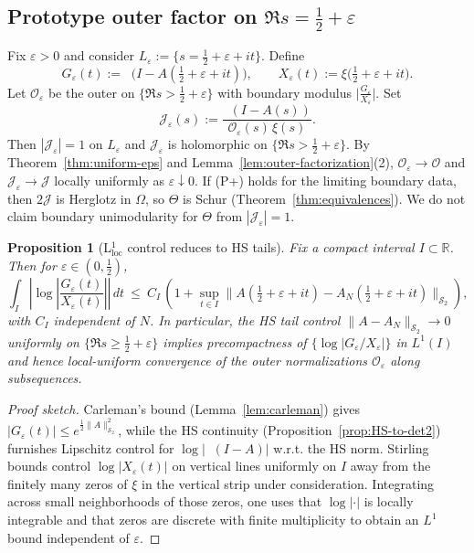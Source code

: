 \documentclass[11pt]{article}
\newtheorem{proposition}[theorem]{Proposition}
\theoremstyle{remark}
\newcommand{\HS}{\mathcal{S}_2}
\DeclareMathOperator{\dettwo}{det_2}
\begin{document}
\subsection{Prototype outer factor on \(\Re s=\tfrac12+\varepsilon\)}\label{subsec:outer-prototype}
Fix \(\varepsilon>0\) and consider \(L_{\varepsilon}:=\{s=\tfrac12+\varepsilon+it\}\). Define
\[
 G_{\varepsilon}(t):=\dettwo\big(I-A(\tfrac12+\varepsilon+it)\big),\qquad X_{\varepsilon}(t):=\xi\big(\tfrac12+\varepsilon+it\big).
\]
Let \(\mathcal O_{\varepsilon}\) be the outer on \(\{\Re s>\tfrac12+\varepsilon\}\) with boundary modulus \(\big|\frac{G_{\varepsilon}}{X_{\varepsilon}}\big|\). Set
\[
 \mathcal J_{\varepsilon}(s):=\frac{\dettwo(I-A(s))}{\mathcal O_{\varepsilon}(s)\,\xi(s)}.
\]
Then \(|\mathcal J_{\varepsilon}|=1\) on \(L_{\varepsilon}\) and \(\mathcal J_{\varepsilon}\) is holomorphic on \(\{\Re s>\tfrac12+\varepsilon\}\). By Theorem~\ref{thm:uniform-eps} and Lemma~\ref{lem:outer-factorization}(2), \(\mathcal O_{\varepsilon}\to\mathcal O\) and \(\mathcal J_{\varepsilon}\to\mathcal J\) locally uniformly as \(\varepsilon\downarrow 0\). If (P+) holds for the limiting boundary data, then \(2\mathcal J\) is Herglotz in \(\Omega\), so \(\Theta\) is Schur (Theorem~\ref{thm:equivalences}). We do not claim boundary unimodularity for \(\Theta\) from \(|\mathcal J_{\varepsilon}|=1\).

\begin{proposition}[L$^1_{\mathrm{loc}}$ control reduces to HS tails]\label{prop:L1loc}
Fix a compact interval $I\subset\mathbb R$. Then for \(\varepsilon\in(0,\tfrac12)\),
\[
 \int_{I}\left|\log\left|\frac{G_{\varepsilon}(t)}{X_{\varepsilon}(t)}\right|\right|\,dt\ \le\ C_I\,\left(1+\sup_{t\in I}\|A(\tfrac12+\varepsilon+it)-A_N(\tfrac12+\varepsilon+it)\|_{\HS}\right),
\]
with $C_I$ independent of $N$. In particular, the HS tail control $\|A-A_N\|_{\HS}\to 0$ uniformly on \(\{\Re s\ge \tfrac12+\varepsilon\}\) implies precompactness of \(\{\log|G_{\varepsilon}/X_{\varepsilon}|\}\) in $L^1(I)$ and hence local-uniform convergence of the outer normalizations \(\mathcal O_{\varepsilon}\) along subsequences.
\end{proposition}
\begin{proof}[Proof sketch]
Carleman's bound (Lemma~\ref{lem:carleman}) gives \(|G_{\varepsilon}(t)|\le e^{\tfrac12\|A\|_{\HS}^2}\), while the HS continuity (Proposition~\ref{prop:HS-to-det2}) furnishes Lipschitz control for \(\log|\dettwo(I-A)|\) w.r.t. the HS norm. Stirling bounds control \(\log|X_{\varepsilon}(t)|\) on vertical lines uniformly on $I$ away from the finitely many zeros of \(\xi\) in the vertical strip under consideration. Integrating across small neighborhoods of those zeros, one uses that \(\log|\cdot|\) is locally integrable and that zeros are discrete with finite multiplicity to obtain an $L^1$ bound independent of \(\varepsilon\).
\end{proof}
\end{document}
